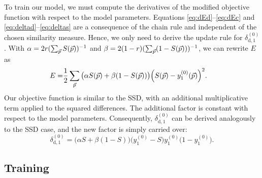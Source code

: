 To train our model, we must compute the derivatives of the modified objective
function with respect to the model parameters. Equations
\ref{eq:dEd}--\ref{eq:dEc} and \ref{eq:deltad}--\ref{eq:deltas} are a
consequence of the chain rule and independent of the chosen similarity measure.
Hence, we only need to derive the update rule for $\delta^{(0)}_{\text{d},1}$.
With $\alpha = 2r (\sum_{\vec{p}}S(\vec{p}))^{-1}$ and $\beta = 2(1 -
r)(\sum_{\vec{p}}(1 - S(\vec{p})))^{-1}$, we can rewrite $E$ as
\begin{align}
E=& \frac{1}{2}\sum_{\vec{p}}\big(\alpha S(\vec{p}) +
\beta(1-S(\vec{p}))\big)\Big(S(\vec{p})-y^{(0)}_1(\vec{p})\Big)^2.
\end{align}
%
Our objective function is similar to the SSD, with an additional multiplicative
term applied to the squared differences. The additional factor is constant with
respect to the model parameters. Consequently, $\delta^{(0)}_{\text{d},1}$ can
be derived analogously to the SSD case, and the new factor is simply carried
over:
\begin{equation} 
\delta^{(0)}_{\text{d},1} = \big(\alpha S + \beta (1 - S)\big)\big(y^{(0)}_1 -
S\big) y^{(0)}_1 \big(1 - y^{(0)}_1\big).
\end{equation}


\subsection{Training}

